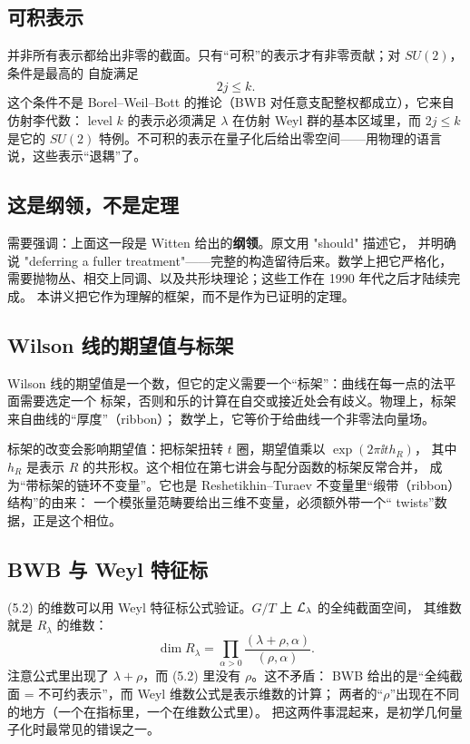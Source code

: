 \subsection{可积表示}

并非所有表示都给出非零的截面。只有“可积”的表示才有非零贡献；对 $SU(2)$，条件是最高的
自旋满足
\[
2j\le k.
\]
这个条件不是 Borel--Weil--Bott 的推论（BWB 对任意支配整权都成立），它来自仿射李代数：
level $k$ 的表示必须满足 $\lambda$ 在仿射 Weyl 群的基本区域里，而 $2j\le k$ 是它的
$SU(2)$ 特例。不可积的表示在量子化后给出零空间——用物理的语言说，这些表示“退耦”了。

\subsection{这是纲领，不是定理}

需要强调：上面这一段是 Witten 给出的\textbf{纲领}。原文用 "should" 描述它，
并明确说 "deferring a fuller treatment"——完整的构造留待后来。数学上把它严格化，
需要抛物丛、相交上同调、以及共形块理论；这些工作在 1990 年代之后才陆续完成。
本讲义把它作为理解的框架，而不是作为已证明的定理。

\subsection{Wilson 线的期望值与标架}

Wilson 线的期望值是一个数，但它的定义需要一个“标架”：曲线在每一点的法平面需要选定一个
标架，否则和乐的计算在自交或接近处会有歧义。物理上，标架来自曲线的“厚度”（ribbon）；
数学上，它等价于给曲线一个非零法向量场。

标架的改变会影响期望值：把标架扭转 $t$ 圈，期望值乘以 $\exp(2\pi\ii t h_R)$，
其中 $h_R$ 是表示 $R$ 的共形权。这个相位在第七讲会与配分函数的标架反常合并，
成为“带标架的链环不变量”。它也是 Reshetikhin--Turaev 不变量里“缎带（ribbon）结构”的由来：
一个模张量范畴要给出三维不变量，必须额外带一个“ twists”数据，正是这个相位。

\subsection{BWB 与 Weyl 特征标}

(5.2) 的维数可以用 Weyl 特征标公式验证。$G/T$ 上 $\mathcal{L}_\lambda$ 的全纯截面空间，
其维数就是 $R_\lambda$ 的维数：
\[
\dim R_\lambda=\prod_{\alpha>0}\frac{(\lambda+\rho,\alpha)}{(\rho,\alpha)} .
\]
注意公式里出现了 $\lambda+\rho$，而 (5.2) 里没有 $\rho$。这不矛盾：
BWB 给出的是“全纯截面 = 不可约表示”，而 Weyl 维数公式是表示维数的计算；
两者的“$\rho$”出现在不同的地方（一个在指标里，一个在维数公式里）。
把这两件事混起来，是初学几何量子化时最常见的错误之一。


